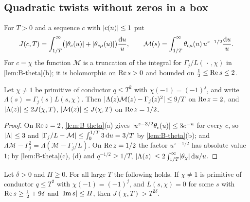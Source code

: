 \subsection{Quadratic twists without zeros in a box}\label{ss:B-quadratic-twists}
For $T>0$ and a sequence $c$ with $\lvert c(n)\rvert\le1$ put
\[
  J(c,T)=\int_{1/T}^\infty\bigl(\lvert \theta_c(u)\rvert+\lvert \theta_{c\mu}(u)\rvert\bigr)\frac{\mathop{}\!\mathrm{d} u}u,
  \qquad
  \mathcal M(s)=\int_{1/T}^\infty\theta_{c\mu}(u)\,u^{s-1/2}\frac{\mathop{}\!\mathrm{d} u}u .
\]
For $c=\chi$ the function $\mathcal M$ is a truncation of the integral for $\Gamma_j/L(\,\cdot\,,\chi)$
in \cref{lem:B-theta}(b); it is holomorphic on $\operatorname{Re} s>0$ and bounded on $\frac12\le\operatorname{Re} s\le2$.

\begin{lemma}\label{lem:B-mollifier}
Let $\chi\ne1$ be primitive of conductor $q\le T^2$ with $\chi(-1)=(-1)^j$, and write
$\Lambda(s)=\Gamma_j(s)L(s,\chi)$. Then $\lvert \Lambda(z)\mathcal M(z)-\Gamma_j(z)^2\rvert\le9/T$ on
$\operatorname{Re} z=2$, and $\lvert \Lambda(z)\rvert\le2J(\chi,T)$, $\lvert \mathcal M(z)\rvert\le J(\chi,T)$ on $\operatorname{Re} z=1/2$.
\end{lemma}

\begin{proof}
On $\operatorname{Re} z=2$, \cref{lem:B-theta}(a) gives $\lvert u^{z-3/2}\theta_{c}(u)\rvert\le3e^{-u}$ for every $c$, so
$\lvert \Lambda\rvert\le3$ and $\lvert \Gamma_j/L-\mathcal M\rvert\le\int_0^{1/T}3\mathop{}\!\mathrm{d} u=3/T$ by \cref{lem:B-theta}(b);
and $\Lambda\mathcal M-\Gamma_j^2=\Lambda(\mathcal M-\Gamma_j/L)$. On $\operatorname{Re} z=1/2$ the factor $u^{z-1/2}$
has absolute value $1$; by \cref{lem:B-theta}(c), (d) and $q^{-1/2}\ge1/T$,
$\lvert \Lambda(z)\rvert\le2\int_{1/T}^\infty\lvert \theta_\chi\rvert\mathop{}\!\mathrm{d} u/u$.
\end{proof}

\begin{proposition}\label{prop:B-three-lines}
Let $\delta>0$ and $H\ge0$. For all large $T$ the following holds. If $\chi\ne1$ is primitive of
conductor $q\le T^2$ with $\chi(-1)=(-1)^j$, and $L(s,\chi)=0$ for some $s$ with
$\operatorname{Re} s\ge\frac12+9\delta$ and $\lvert \operatorname{Im} s\rvert\le H$, then $J(\chi,T)>T^{2\delta}$.
\end{proposition}

